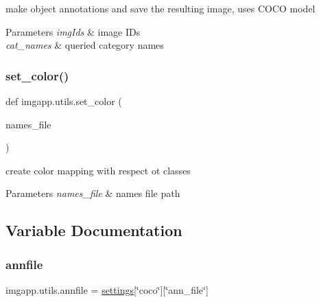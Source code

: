 make object annotations and save the resulting image, uses C\+O\+CO model 


\begin{DoxyParams}{Parameters}
{\em img\+Ids} & image I\+Ds \\
\hline
{\em cat\+\_\+names} & queried category names \\
\hline
\end{DoxyParams}
\mbox{\label{namespaceimgapp_1_1utils_a6d744ddd54588b6d14e6dc10b504e5c3}} 
\subsubsection{\texorpdfstring{set\+\_\+color()}{set\_color()}}
{\footnotesize\ttfamily def imgapp.\+utils.\+set\+\_\+color (\begin{DoxyParamCaption}\item[{}]{names\+\_\+file }\end{DoxyParamCaption})}



create color mapping with respect ot classes 


\begin{DoxyParams}{Parameters}
{\em names\+\_\+file} & names file path \\
\hline
\end{DoxyParams}


\subsection{Variable Documentation}
\mbox{\label{namespaceimgapp_1_1utils_a8e182872d7fd166b733945c31c6e75b0}} 
\subsubsection{\texorpdfstring{annfile}{annfile}}
{\footnotesize\ttfamily imgapp.\+utils.\+annfile = \hyperlink{namespaceimgapp_1_1utils_ab8f7f09b0a834029cdce936a10744e75}{settings}\mbox{[}\char`\"{}coco\char`\"{}\mbox{]}\mbox{[}\char`\"{}ann\+\_\+file\char`\"{}\mbox{]}}



